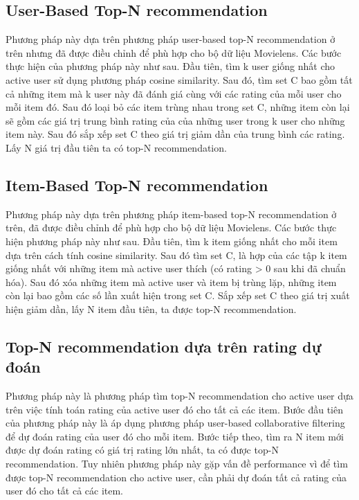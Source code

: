 \subsection{User-Based Top-N recommendation}
Phương pháp này dựa trên phương pháp user-based top-N recommendation ở trên nhưng đã được điều chỉnh để phù hợp cho bộ dữ liệu Movielens. Các bước thực hiện của phương pháp này như sau. Đầu tiên, tìm k user giống nhất cho active user sử dụng phương pháp cosine similarity. Sau đó, tìm set C bao gồm tất cả những item mà k user này đã đánh giá cùng với các rating của mỗi user cho mỗi item đó. Sau đó loại bỏ các item trùng nhau trong set C, những item còn lại sẽ gồm các giá trị trung bình rating của của những user trong k user cho những item này. Sau đó sắp xếp set C theo giá trị giảm dần của trung bình các rating. Lấy N giá trị đầu tiên ta có top-N recommendation.

\subsection{Item-Based Top-N recommendation}
Phương pháp này dựa trên phương pháp item-based top-N recommendation ở trên, đã được điều chỉnh để phù hợp cho bộ dữ liệu Movielens. Các bước thực hiện phương pháp này như sau. Đầu tiên, tìm k item giống nhất cho mỗi item dựa trên cách tính cosine similarity. Sau đó tìm set C, là hợp của các tập k item giống nhất với những item mà active user thích (có rating > 0 sau khi đã chuẩn hóa). Sau đó xóa những item mà active user và item bị trùng lặp, những item còn lại bao gồm các số lần xuất hiện trong set C. Sắp xếp set C theo giá trị xuất hiện giảm dần, lấy N item đầu tiên, ta được top-N recommendation.

\subsection{Top-N recommendation dựa trên rating dự đoán}
Phương pháp này là phương pháp tìm top-N recommendation cho active user dựa trên việc tính toán rating của active user đó cho tất cả các item. Bước đầu tiên của phương pháp này là áp dụng phương pháp user-based collaborative filtering để dự đoán rating của user đó cho mỗi item. Bước tiếp theo, tìm ra N item mới được dự đoán rating có giá trị rating lớn nhất, ta có được top-N recommendation. Tuy nhiên phương pháp này gặp vấn đề performance vì để tìm được top-N recommendation cho active user, cần phải dự đoán tất cả rating của user đó cho tất cả các item.